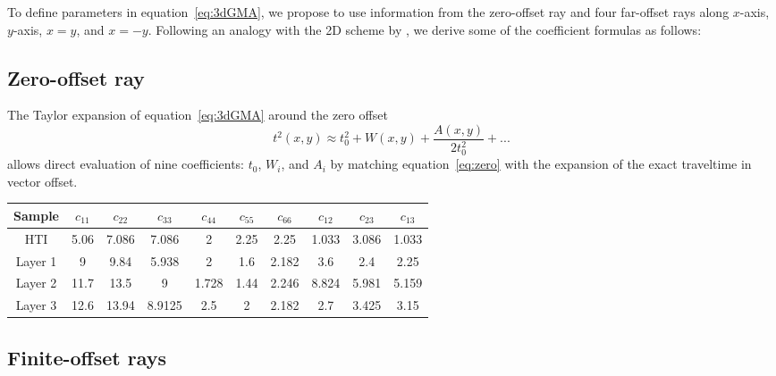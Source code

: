To define parameters in equation~\ref{eq:3dGMA}, we propose to use information from the zero-offset ray and four far-offset rays along $x$-axis, $y$-axis, $x=y$, and $x=-y$. Following an analogy with the 2D scheme by \cite{fomelstovas}, we derive some of the coefficient formulas as follows:

\subsection{Zero-offset ray}

The Taylor expansion of equation~\ref{eq:3dGMA} around the zero offset
\begin{equation}
\label{eq:zero}
t^2(x,y) \approx t^2_0 + W(x,y) + \frac{A(x,y)}{2 t_0^2} + ...
\end{equation}
allows  direct evaluation of nine coefficients: $t_0$, $W_i$, and $A_i$ by matching equation~\ref{eq:zero} with the expansion of the exact traveltime in vector offset. 

{
\centering
     	     \begin{tabular}{|c|c|c|c|c|c|c|c|c|c|}
     	     \hline Sample & $ c_{11}$ & $ c_{22}$ & $ c_{33}$ & $ c_{44} $ & $ c_{55}$ & $ c_{66}$ & $ c_{12}$ & $ c_{23}$ & $ c_{13}$ \\ 
     	     \hline HTI & 5.06 & 7.086 & 7.086 & 2 & 2.25 & 2.25 & 1.033 & 3.086 & 1.033\\
     	     \hline Layer 1 & 9 & 9.84 & 5.938 & 2 & 1.6 & 2.182 & 3.6 & 2.4 & 2.25\\
     	     \hline Layer 2 & 11.7 & 13.5 & 9 & 1.728 & 1.44 & 2.246 & 8.824 & 5.981 & 5.159 \\
     	     \hline Layer 3 & 12.6 & 13.94 & 8.9125 & 2.5 & 2 & 2.182 & 2.7 & 3.425 & 3.15 \\
      \hline
    \end{tabular}
}

\subsection{Finite-offset rays}

